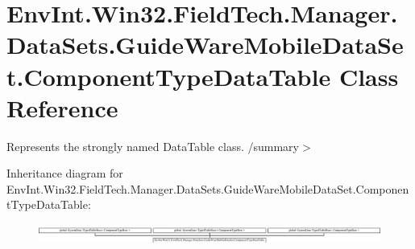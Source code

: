 \hypertarget{class_env_int_1_1_win32_1_1_field_tech_1_1_manager_1_1_data_sets_1_1_guide_ware_mobile_data_set_1_1_component_type_data_table}{}\section{Env\+Int.\+Win32.\+Field\+Tech.\+Manager.\+Data\+Sets.\+Guide\+Ware\+Mobile\+Data\+Set.\+Component\+Type\+Data\+Table Class Reference}
\label{class_env_int_1_1_win32_1_1_field_tech_1_1_manager_1_1_data_sets_1_1_guide_ware_mobile_data_set_1_1_component_type_data_table}


Represents the strongly named Data\+Table class. /summary$>$  


Inheritance diagram for Env\+Int.\+Win32.\+Field\+Tech.\+Manager.\+Data\+Sets.\+Guide\+Ware\+Mobile\+Data\+Set.\+Component\+Type\+Data\+Table\+:\begin{figure}[H]
\begin{center}
\leavevmode
\includegraphics[height=0.661939cm]{class_env_int_1_1_win32_1_1_field_tech_1_1_manager_1_1_data_sets_1_1_guide_ware_mobile_data_set_1_1_component_type_data_table}
\end{center}
\end{figure}
